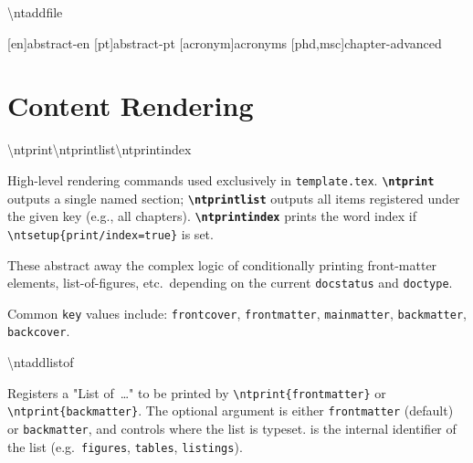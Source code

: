 \begin{macrodoc}{\textbackslash ntaddfile}
\begin{latexcode}
[en]{abstract-en}
[pt]{abstract-pt}
[acronym]{acronyms}
[phd,msc]{chapter-advanced}%
\end{latexcode}
\end{macrodoc}

\section{Content Rendering}
\label{sec:int_rendering}

\begin{macrodoc}{\textbackslash ntprint\quad\textbackslash ntprintlist\quad\textbackslash ntprintindex}

High-level rendering commands used exclusively in \texttt{template.tex}.
\textbf{\texttt{\textbackslash ntprint}} outputs a single named
section; \textbf{\texttt{\textbackslash ntprintlist}} outputs all
items registered under the given key (e.g., all chapters).
\textbf{\texttt{\textbackslash ntprintindex}} prints the word index
if \texttt{\textbackslash ntsetup\{print/index=true\}} is set.

These abstract away the complex logic of conditionally printing
front-matter elements, list-of-figures, etc.\ depending on the
current \texttt{docstatus} and \texttt{doctype}.

Common \texttt{key} values include:
\texttt{frontcover}, \texttt{frontmatter}, \texttt{mainmatter},
\texttt{backmatter}, \texttt{backcover}.
\end{macrodoc}

\bigskip

\begin{macrodoc}{\textbackslash ntaddlistof}

Registers a "List of~…" to be printed by
\texttt{\textbackslash ntprint\{frontmatter\}} or
\texttt{\textbackslash ntprint\{backmatter\}}.
The optional  argument is either
\texttt{frontmatter} (default) or \texttt{backmatter},
and controls where the list is typeset.
 is the internal identifier of the list
(e.g.\ \texttt{figures}, \texttt{tables}, \texttt{listings}).

\begin{latexcode}
\end{latexcode}
\end{macrodoc}

